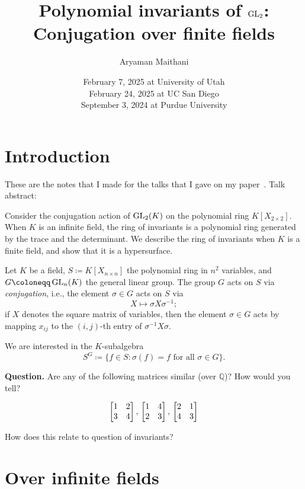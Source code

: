 \documentclass[12pt]{article}
\title{Polynomial invariants of \texorpdfstring{$\operatorname{GL}_{2}$}{GL(2)}: Conjugation over finite fields}
\author{Aryaman Maithani}
\date{%
February 7, 2025 at University of Utah \\ 
February 24, 2025 at UC San Diego \\
September 3, 2024 at Purdue University %
}
\begin{document}
\maketitle

\section*{Introduction}

	These are the notes that I made for the talks that I gave on my paper~\Cite{Maithani:Conjugation}. Talk abstract: \newline

	\begin{blockquote}
		Consider the conjugation action of $\operatorname{GL}_{2}(K)$ on the polynomial ring $K[X_{2 \times 2}]$. 
		When $K$ is an infinite field, the ring of invariants is a polynomial ring generated by the trace and the determinant. 
		We describe the ring of invariants when $K$ is a finite field, and show that it is a hypersurface.
	\end{blockquote}

	Let $K$ be a field, $S \coloneqq K[X_{n \times n}]$ the polynomial ring in $n^{2}$ variables, and $G \coloneqq \GL_{n}(K)$ the general linear group. 
	The group $G$ acts on $S$ via \emph{conjugation}, i.e., the element $\sigma \in G$ acts on $S$ via
	\begin{equation*} 
		X \mapsto \sigma X \sigma^{-1};
	\end{equation*}
	if $X$ denotes the square matrix of variables, then the element $\sigma \in G$ acts by mapping $x_{ij}$ to the $(i, j)$-th entry of $\sigma^{-1} X \sigma$. 

	We are interested in the $K$-subalgebra
	\begin{equation*} 
		S^{G} \coloneqq \{f \in S : \sigma(f) = f \text{ for all } \sigma \in G\}.
	\end{equation*}

	\textbf{Question.} Are any of the following matrices similar (over $\mathbb{Q}$)? How would you tell?

	\begin{equation*} 
		\begin{bmatrix} 1 & 2 \\ 3 & 4 \end{bmatrix},\, \begin{bmatrix} 1 & 4 \\ 2 & 3 \end{bmatrix},\, \begin{bmatrix} 2 & 1 \\ 4 & 3 \end{bmatrix}
	\end{equation*}

	How does this relate to question of invariants? 

\section{Over infinite fields}
\end{document}
